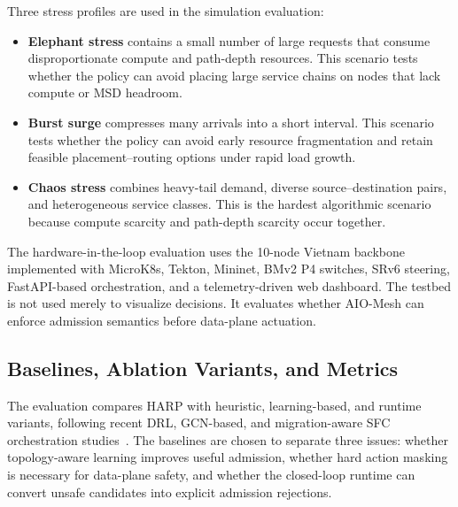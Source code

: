 \documentclass[final,5p]{elsarticle}
\begin{document}
Three stress profiles are used in the simulation evaluation:
\begin{itemize}
    \item \textbf{Elephant stress} contains a small number of large requests that consume disproportionate compute and path-depth resources. This scenario tests whether the policy can avoid placing large service chains on nodes that lack compute or MSD headroom.
    \item \textbf{Burst surge} compresses many arrivals into a short interval. This scenario tests whether the policy can avoid early resource fragmentation and retain feasible placement--routing options under rapid load growth.
    \item \textbf{Chaos stress} combines heavy-tail demand, diverse source--destination pairs, and heterogeneous service classes. This is the hardest algorithmic scenario because compute scarcity and path-depth scarcity occur together.
\end{itemize}

The hardware-in-the-loop evaluation uses the 10-node Vietnam backbone implemented with MicroK8s, Tekton, Mininet, BMv2 P4 switches, SRv6 steering, FastAPI-based orchestration, and a telemetry-driven web dashboard. The testbed is not used merely to visualize decisions. It evaluates whether AIO-Mesh can enforce admission semantics before data-plane actuation.

\subsection{Baselines, Ablation Variants, and Metrics}
\label{subsec:baselines_metrics}

The evaluation compares HARP with heuristic, learning-based, and runtime variants, following recent DRL, GCN-based, and migration-aware SFC orchestration studies~\cite{xiao2023twostage,liu2024sfcml,addad2022ai,tariq2023fipam,afrasiabi2024cluster}. The baselines are chosen to separate three issues: whether topology-aware learning improves useful admission, whether hard action masking is necessary for data-plane safety, and whether the closed-loop runtime can convert unsafe candidates into explicit admission rejections.
\end{document}
